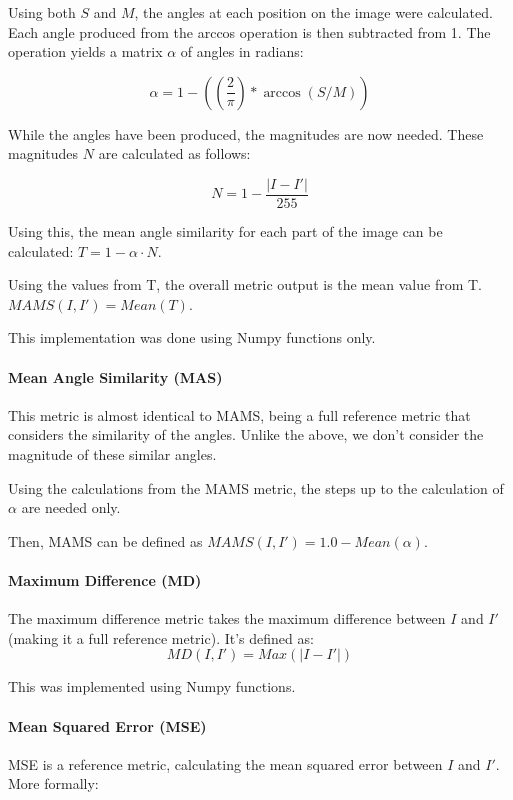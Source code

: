 \documentclass[10pt,a4paper]{article}
\begin{document}
                Using both $S$ and $M$, the angles at each position on the image were calculated. Each angle produced from the arccos operation is then subtracted from 1. The operation yields a matrix $\alpha$ of angles in radians:

                $$\alpha = 1 - ((\frac{2}{\pi}) * \arccos(S / M))$$
            
                While the angles have been produced, the magnitudes are now needed. These magnitudes $N$ are calculated as follows:

                $$N = 1 - \frac{|I - I'|}{255}$$

                Using this, the mean angle similarity for each part of the image can be calculated:
                $T = 1 - \alpha \cdot N$.

                Using the values from T, the overall metric output is the mean value from T. $MAMS(I, I') = Mean(T)$.
                
                This implementation was done using Numpy functions only.

            \paragraph{Mean Angle Similarity (MAS)}
                This metric is almost identical to MAMS, being a full reference metric that considers the similarity of the angles. Unlike the above, we don't
                consider the magnitude of these similar angles.

                Using the calculations from the MAMS metric, the steps up to the calculation of $\alpha$ are needed only.

                Then, MAMS can be defined as $MAMS(I, I') = 1.0 - Mean(\alpha)$.

            \paragraph{Maximum Difference (MD)}
                The maximum difference metric takes the maximum difference between $I$ and $I'$ (making it a full reference metric). It's defined as:
                $$MD(I, I') = Max(|I - I'|)$$

                This was implemented using Numpy functions.
            \paragraph{Mean Squared Error (MSE)}
                MSE is a reference metric, calculating the mean squared error between $I$ and $I'$. More formally:
\end{document}
